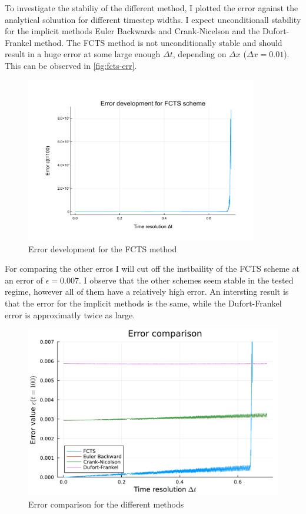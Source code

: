 \documentclass[
	a4paper, %
	10pt, %
]{CSUniSchoolLabReport}
\begin{document}
To investigate the stabiliy of the different method, I plotted the error against the analytical soluution for different timestep widths. I expect unconditionall stability for the implicit methods Euler Backwards and Crank-Nicelson and the Dufort-Frankel method. The FCTS method is not unconditionally stable and should result in a huge error at some large enough $\Delta t$, depending on $\Delta x$ ($\Delta x = 0.01$). This can be observed in \autoref{fig:fcts-err}.

\begin{figure}[H]
	\centering
	\includegraphics[width=0.9\textwidth]{../saves_t2/error_development_fcts.pdf}
	\caption{Error development for the FCTS method}
	\label{fig:fcts-err}
\end{figure}


For comparing the other erros I will cut off the instbaility of the FCTS scheme at an error of $\epsilon = 0.007$. I observe that the other schemes seem stable in the tested regime, however all of them have a relatively high error. An intersting result is that the error for the implicit methods is the same, while  the Dufort-Frankel error is approximatly twice as large.

\begin{figure}[H]
	\centering
	\includegraphics[width=\textwidth]{../saves_t2/error_comp_diffusion.pdf}
	\caption{Error comparison for the different methods}
\end{figure}
\end{document}
